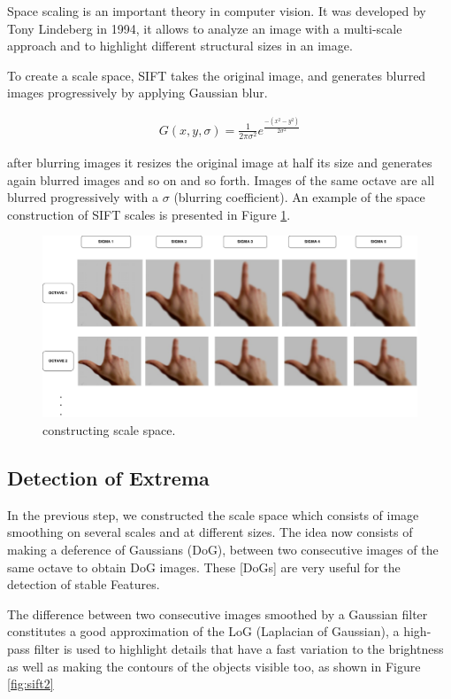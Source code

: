Space scaling  is an important theory in computer vision.
It was developed by Tony Lindeberg in 1994, it allows to analyze an image with a multi-scale approach and to highlight different  structural  sizes in an image.

To create a scale space, SIFT takes the original image, and generates blurred images progressively by applying Gaussian blur.

\begin{align} 
 G(x, y,\sigma )  =\frac{1}{2\pi\sigma^2} e^{\frac{-( x^2 -  y^2)}{2\sigma^2}}
\end{align}


after  blurring images it resizes the original image at half its size and generates again blurred images and so on and so forth.
Images of the same octave are all blurred progressively  with a $\sigma$ (blurring coefficient). An example of the space construction of SIFT scales is presented in Figure \ref{fig:scale}.



\begin{figure}[H]
\centering
\includegraphics[scale = 0.25]{img/scale_space.pdf}
\caption{ constructing scale space.}
\label{fig:scale}
\end{figure}

\subsection{Detection of Extrema}
In the previous step, we constructed the scale space which consists of image smoothing on several scales and at different sizes. The idea now consists of making a deference of Gaussians (DoG), between two consecutive images of the same octave to obtain DoG images. These [DoGs]  are very useful for the detection of stable Features.


The difference between two consecutive images smoothed by a Gaussian filter constitutes a good approximation of the LoG (Laplacian of Gaussian), a high-pass filter is used to highlight  details that have a fast variation to the brightness  as well as  making the contours  of the objects  visible too, as shown in Figure \ref{fig:sift2}


